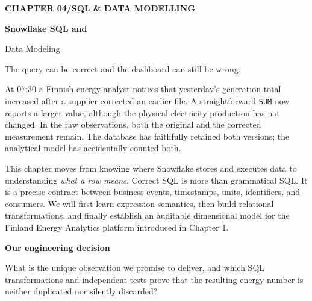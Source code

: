 \documentclass[11pt,twoside]{article}
\begin{document}
{\sffamily\bfseries\color{teal}\fontsize{10}{12}\selectfont CHAPTER 04\quad /\quad SQL \& DATA MODELLING}\par\vspace{2mm}
{\sffamily\bfseries\color{navy}\fontsize{23}{26}\selectfont Snowflake SQL and\par Data Modeling}\par
\vspace{1.6mm}{\color{steelblue}\rule{\linewidth}{1.5pt}}\par\vspace{2mm}
{\sffamily\color{inkgray}\fontsize{11.1}{14.5}\selectfont The query can be correct and the dashboard can still be wrong.}\par\vspace{2mm}

At 07:30 a Finnish energy analyst notices that yesterday's generation total increased after a supplier corrected an earlier file. A straightforward \texttt{SUM} now reports a larger value, although the physical electricity production has not changed. In the raw observations, both the original and the corrected measurement remain. The database has faithfully retained both versions; the analytical model has accidentally counted both.

This chapter moves from knowing where Snowflake stores and executes data to understanding \emph{what a row means}. Correct SQL is more than grammatical SQL. It is a precise contract between business events, timestamps, units, identifiers, and consumers. We will first learn expression semantics, then build relational transformations, and finally establish an auditable dimensional model for the Finland Energy Analytics platform introduced in Chapter 1.

\begin{insight}\textbf{Our engineering decision}\par
What is the unique observation we promise to deliver, and which SQL transformations and independent tests prove that the resulting energy number is neither duplicated nor silently discarded?\end{insight}
\end{document}
